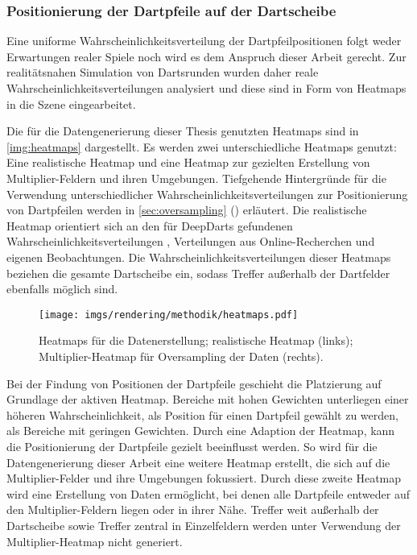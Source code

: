 \subsubsection{Positionierung der Dartpfeile auf der Dartscheibe}
\label{sec:dartpfeil_positionierung}

Eine uniforme Wahrscheinlichkeitsverteilung der Dartpfeilpositionen folgt weder Erwartungen realer Spiele noch wird es dem Anspruch dieser Arbeit gerecht. Zur realitätsnahen Simulation von Dartsrunden wurden daher reale Wahrscheinlichkeitsverteilungen analysiert und diese sind in Form von Heatmaps in die Szene eingearbeitet.

Die für die Datengenerierung dieser Thesis genutzten Heatmaps sind in \autoref{img:heatmaps} dargestellt. Es werden zwei unterschiedliche Heatmaps genutzt: Eine realistische Heatmap und eine Heatmap zur gezielten Erstellung von Multiplier-Feldern und ihren Umgebungen. Tiefgehende Hintergründe für die Verwendung unterschiedlicher Wahrscheinlichkeitsverteilungen zur Positionierung von Dartpfeilen werden in \autoref{sec:oversampling} () erläutert. Die realistische Heatmap orientiert sich an den für DeepDarts gefundenen Wahrscheinlichkeitsverteilungen \cite{deepdarts}, Verteilungen aus Online-Recherchen \cite{heatmap} und eigenen Beobachtungen. Die Wahrscheinlichkeitsverteilungen dieser Heatmaps beziehen die gesamte Dartscheibe ein, sodass Treffer außerhalb der Dartfelder ebenfalls möglich sind.

\begin{figure}
    \centering
    \texttt{[image: imgs/rendering/methodik/heatmaps.pdf]}
    \caption{Heatmaps für die Datenerstellung; realistische Heatmap (links); Multiplier-Heatmap für Oversampling der Daten (rechts).}
    \label{img:heatmaps}
\end{figure}

Bei der Findung von Positionen der Dartpfeile geschieht die Platzierung auf Grundlage der aktiven Heatmap. Bereiche mit hohen Gewichten unterliegen einer höheren Wahrscheinlichkeit, als Position für einen Dartpfeil gewählt zu werden, als Bereiche mit geringen Gewichten. Durch eine Adaption der Heatmap, kann die Positionierung der Dartpfeile gezielt beeinflusst werden. So wird für die Datengenerierung dieser Arbeit eine weitere Heatmap erstellt, die sich auf die Multiplier-Felder und ihre Umgebungen fokussiert. Durch diese zweite Heatmap wird eine Erstellung von Daten ermöglicht, bei denen alle Dartpfeile entweder auf den Multiplier-Feldern liegen oder in ihrer Nähe. Treffer weit außerhalb der Dartscheibe sowie Treffer zentral in Einzelfeldern werden unter Verwendung der Multiplier-Heatmap nicht generiert.

